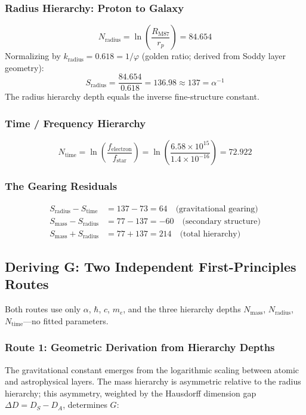 \documentclass[11pt,a4paper]{article}
\begin{document}
\subsubsection{Radius Hierarchy: Proton to Galaxy}

\[
  N_{\text{radius}} = \ln\left(\frac{R_{\text{M87}}}{r_p}\right) = 84.654
\]
Normalizing by $k_{\text{radius}} = 0.618 = 1/\varphi$ (golden ratio; derived from
Soddy layer geometry):
\[
  S_{\text{radius}} = \frac{84.654}{0.618} = 136.98 \approx \boxed{137 = \alpha^{-1}}
\]
The radius hierarchy depth equals the inverse fine-structure constant.

\subsubsection{Time / Frequency Hierarchy}

\[
  N_{\text{time}} = \ln\left(\frac{f_{\text{electron}}}{f_{\text{star}}}\right)
    = \ln\left(\frac{6.58\times10^{15}}{1.4\times10^{-16}}\right) = 72.922
\]

\subsubsection{The Gearing Residuals}

\begin{align}
  S_{\text{radius}} - S_{\text{time}} &= 137 - 73 = 64 \quad\text{(gravitational gearing)} \\
  S_{\text{mass}} - S_{\text{radius}} &= 77 - 137 = -60 \quad\text{(secondary structure)} \\
  S_{\text{mass}} + S_{\text{radius}} &= 77 + 137 = 214 \quad\text{(total hierarchy)}
\end{align}

\subsection{Deriving G: Two Independent First-Principles Routes}

Both routes use only $\alpha$, $\hbar$, $c$, $m_e$, and the three hierarchy depths
$N_{\text{mass}}$, $N_{\text{radius}}$, $N_{\text{time}}$---no fitted parameters.

\subsubsection{Route 1: Geometric Derivation from Hierarchy Depths}

The gravitational constant emerges from the logarithmic scaling between atomic and
astrophysical layers. The mass hierarchy is asymmetric relative to the radius
hierarchy; this asymmetry, weighted by the Hausdorff dimension gap
$\Delta D = D_S - D_A$, determines $G$:
\end{document}
